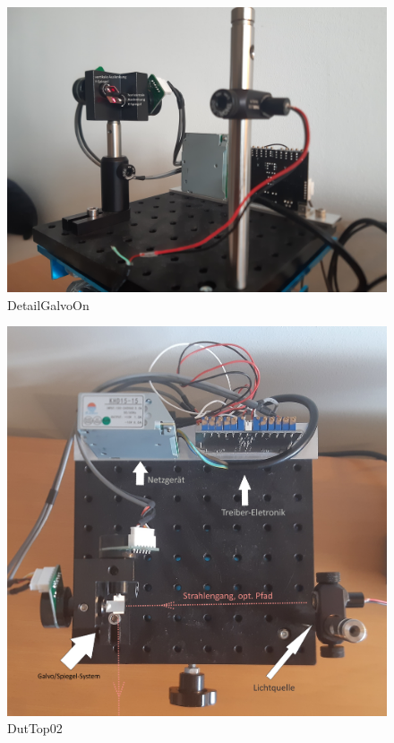 \begin{figure}[h!]	\centering	\includegraphics[width=\textwidth]{pics/DetailGalvoOn.jpg}	\caption{DetailGalvoOn}	\label{DetailGalvoOn}	\end{figure}
\begin{figure}[h!]	\centering	\includegraphics[width=\textwidth]{pics/DutTop02.jpg}	\caption{DutTop02}	\label{DutTop02}	\end{figure}

